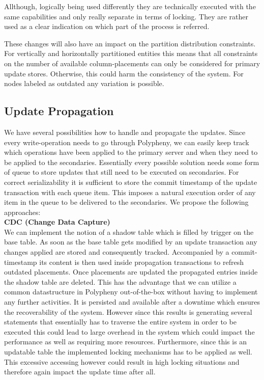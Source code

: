 Allthough, logically being used differently they are technically executed with the same capabilities and only really separate in terms of locking.
They are rather used as a clear indication on which part of the process is referred.

These changes will also have an impact on the partition distribution constraints. For vertically and horizontally partitioned 
entities this means that all constraints on the number of available column-placements can only be considered for primary update stores. Otherwise, this could harm
the consistency of the system. For nodes labeled as outdated any variation is possible.

\subsection{Update Propagation}
We have several possibilities how to handle and propagate the updates.
Since every write-operation needs to go through Polypheny, we can easily keep track which operations have been applied to the primary server and when 
they need to be applied to the secondaries. Essentially every possible solution needs some form of queue to store updates that still need to be executed 
on secondaries. For correct serializability it is sufficient to store the commit timestamp of the update transaction with each queue item. This imposes a natural
execution order of any item in the queue to be delivered to the secondaries.
We propose the following approaches: \\

\textbf{CDC (Change Data Capture)}\\
We can implement the notion of a shadow table which is filled by trigger on the base table.
As soon as the base table gets modified by an update transaction any changes applied are stored and consequently tracked.
Accompanied by a commit-timestamp its content is then used inside propagation transactions to refresh outdated placements.
Once placements are updated the propagated entries inside the shadow table are deleted. 
This has the advantage that we can utilize a common datastructure in Polypheny out-of-the-box without having to implement any further activities.
It is persisted and available after a downtime which ensures the recoverability of the system.
However since this results is generating several statements that essentially has to traverse the entire system in order to be executed this could lead to 
large overhead in the system which could impact the performance as well as requiring more resources.
Furthermore, since this is an updatable table the implemented locking mechanisms has to be applied as well. This excessive accessing however could result in high 
locking situations and therefore again impact the update time after all.\\

